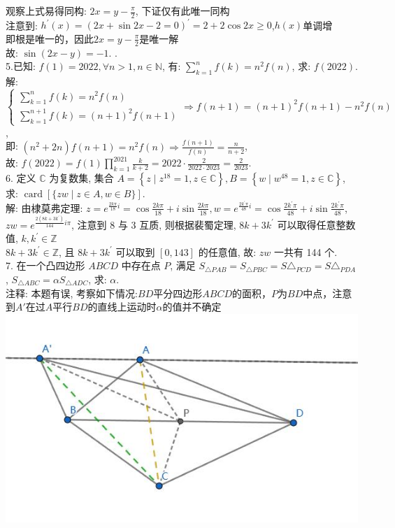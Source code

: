 \documentclass[a4paper,11pt,UTF8]{article}
\begin{document}
观察上式易得同构:  $\displaystyle2 x=y-\frac{\pi}{2}$, 下证仅有此唯一同构\\
注意到: $h^{\prime}(x)=(2x+ \sin 2 x-2=0)^{\prime}=2+2\cos 2x \geq 0$,$h(x)$单调增\\
即根是唯一的，因此$\displaystyle2 x=y-\frac{\pi}{2}$是唯一解\\
故: $\sin (2 x-y)=-1$. .\\
5.已知: $f(1)=2022, \forall n>1, n \in \mathbb{N}$, 有: $\displaystyle\sum_{k=1}^n f(k)=n^2 f(n)$, 求: $f(2022)$.\\
解: $\left\{\begin{array}{l}\displaystyle\sum_{k=1}^n f(k)=n^2 f(n) \\ \displaystyle\sum_{k=1}^{n+1} f(k)=(n+1)^2 f(n+1)\end{array} \Rightarrow f(n+1)=(n+1)^2 f(n+1)-n^2 f(n)\right.$,\\
即: $\displaystyle\left(n^2+2 n\right) f(n+1)=n^2 f(n) \Rightarrow \frac{f(n+1)}{f(n)}=\frac{n}{n+2}$,\\
故: $\displaystyle f(2022)=f(1) \prod_{k=1}^{2021} \frac{k}{k+2}=2022 \cdot \frac{2}{2022 \cdot 2023}=\frac{2}{2023}$.\\
6. 定义 $\mathbb{C}$ 为复数集, 集合 $A=\left\{z \mid z^{18}=1, z \in \mathbb{C}\right\}, B=\left\{w \mid w^{48}=1, z \in \mathbb{C}\right\}$,\\
求: $\operatorname{card}[\{z w \mid z \in A, w \in B\}]$.\\
解: 由棣莫弗定理: $\displaystyle z=e^{\frac{2 k \pi}{18} i}=\cos \frac{2 k \pi}{18}+i \sin \frac{2 k \pi}{18}, w=e^{\frac{2 k^{\prime} \pi}{48} i}=\cos \frac{2 k^{\prime} \pi}{48}+i \sin \frac{2 k^{\prime} \pi}{48}$,\\
$\displaystyle z w=e^{\frac{2\left(8 k+3 k^{\prime}\right)}{144} i \pi}$, 注意到 8 与 3 互质, 则根据裴蜀定理, $8 k+3 k^{\prime}$ 可以取得任意整数值, $k, k^{\prime} \in \mathbb{Z}$\\
$8 k+3 k^{\prime} \in \mathbb{Z}$, 且 $8 k+3 k^{\prime}$ 可以取到 $[0,143]$ 的任意值, 故: $z w$ 一共有 144 个.\\
7. 在一个凸四边形 $A B C D$ 中存在点 $P$, 满足 $S _{\triangle P A B}=S _{\triangle P B C}=S \triangle_{ P C D}=S \triangle _{P D A}$,
$S _{\triangle A B C}=\alpha S _{\triangle A D C}$, 求: $\alpha$.\\
注释: 本题有误, 考察如下情况:$BD$平分四边形$ABCD$的面积，$P$为$BD$中点，注意到$A'$在过$A$平行$BD$的直线上运动时$\alpha$的值并不确定\\
\includegraphics[scale=1]{./2022T7fig.jpg}
\end{document}
